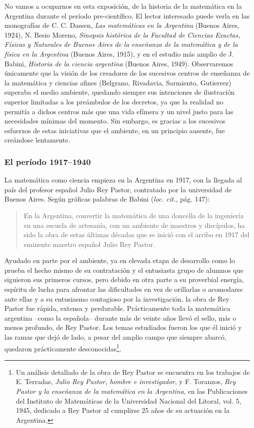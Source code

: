 No vamos a ocuparnos en esta exposición, de la historia de la matemática en la
Argentina durante el período pre-científico. El lector interesado puede verla
en las monografías de C. C. Dassen, \emph{Las matemáticas en la Argentina}
(Buenos Aires, 1924), N. Besio Moreno, \emph{Sinopsis histórica de la Facultad
de Ciencias Exactas, Físicas y Naturales de Buenos Aires de la enseñanza de la
matemática y de la física en la Argentina} (Buenos Aires, 1915), y en el
estudio más amplio de J. Babini, \emph{Historia de la ciencia argentina}
(Buenos Aires, 1949). Observaremos únicamente que la visión de los creadores de
los sucesivos centros de enseñanza de la matemática y ciencias afines
(Belgrano, Rivadavia, Sarmiento, Gutierrez) superaba el medio ambiente,
quedando siempre sus intenciones de ilustración superior limitadas a los
preámbulos de los decretos, ya que la realidad no permitía a dichos centros más
que una vida efímera y un nivel justo para las necesidades mínimas del momento.
Sin embargo, es gracias a los sucesivos esfuerzos de estas iniciativas que el
ambiente, en un principio ausente, fue creándose lentamente. 

\subsubsection*{El período 1917--1940}

La matemática como ciencia empieza en la Argentina en 1917, con la llegada al
país del profesor español Julio Rey Pastor, contratado por la universidad de
Buenos Aires. Según gráficas palabras de Babini (\emph{loc. cit.}, pág. 147):

\begin{quote}
	En la Argentina, convertir la matemática de una doncella de la ingeniería
	en una escuela de artesanía, con un ambiente de maestros y discípulos, ha
	sido la obra de estas últimas décadas que se inició con el arribo en 1917
	del eminente maestro español Julio Rey Pastor.  
\end{quote}

Ayudado en parte por el ambiente, ya en elevada etapa de desarrollo como lo
prueba el hecho mismo de su contratación y el entusiasta grupo de alumnos que
siguieron sus primeros cursos, pero debido en otra parte a su proverbial
energía, espíritu de lucha para afrontar las dificultades en vez de orillarlas
o acomodarse ante ellas y a su entusiasmo contagioso por la investigación, la
obra de Rey Pastor fue rápida, extensa y perdurable. Prácticamente toda la
matemática argentina --como la española-- durante más de veinte años llevó el
sello, más o menos profundo, de Rey Pastor. Los temas estudiados fueron los
que él inició y las ramas que dejó de lado, a pesar del amplio campo que
siempre abarcó, quedaron prácticamente desconocidas\footnote{Un análisis
	detallado de la obra de Rey Pastor se encuentra en los trabajos de E.
	Terradas, \emph{Julio Rey Pastor, hombre e investigador}, y F. Toranzos,
	\emph{Rey Pastor y la enseñanza de la matemática en la Argentina}, en las
Publicaciones del Instituto de Matemáticas de la Universidad Nacional del
Litoral, vol. 5, 1945, dedicado a Rey Pastor al cumplirse 25 años de su
actuación en la Argentina.}.

